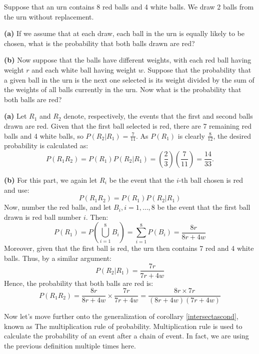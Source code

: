         \begin{example}
            Suppose that an urn contains 8 red balls and 4 white balls. We draw 2 balls from the urn without replacement.
            
            \textbf{(a)} If we assume that at each draw, each ball in the urn is equally likely to be chosen, what is the probability that both balls drawn are red?
            
            \textbf{(b)} Now suppose that the balls have different weights, with each red ball having weight \(r\) and each white ball having weight \(w\). Suppose that the probability that a given ball in the urn is the next one selected is its weight divided by the sum of the weights of all balls currently in the urn. Now what is the probability that both balls are red?
            \end{example}
            
            \begin{solution}
            \textbf{(a)} Let \( R_1 \) and \( R_2 \) denote, respectively, the events that the first and second balls drawn are red. Given that the first ball selected is red, there are 7 remaining red balls and 4 white balls, so \( P(R_2|R_1) = \frac{7}{11} \). As \( P(R_1) \) is clearly \(\frac{8}{12}\), the desired probability is calculated as:
            \[
            P(R_1 R_2) = P(R_1)P(R_2|R_1) = \left(\frac{2}{3}\right)\left(\frac{7}{11}\right) = \frac{14}{33}.
            \]
            
            \textbf{(b)} For this part, we again let \( R_i \) be the event that the \(i\)-th ball chosen is red and use:
            \[
            P(R_1 R_2) = P(R_1)P(R_2|R_1)
            \]
            Now, number the red balls, and let \( B_i, i = 1, \ldots, 8 \) be the event that the first ball drawn is red ball number \( i \). Then:
            \[
            P(R_1) = P\left(\bigcup_{i=1}^8 B_i\right) = \sum_{i=1}^8 P(B_i) = \frac{8r}{8r + 4w}
            \]
            Moreover, given that the first ball is red, the urn then contains 7 red and 4 white balls. Thus, by a similar argument:
            \[
            P(R_2|R_1) = \frac{7r}{7r + 4w}
            \]
            Hence, the probability that both balls are red is:
            \[
            P(R_1 R_2) = \frac{8r}{8r + 4w} \times \frac{7r}{7r + 4w} = \frac{8r \times 7r}{(8r + 4w)(7r + 4w)}
            \]
            \end{solution}
    
        Now let's move further onto the generalization of corollary \ref{intersectascond}, known as The multiplication rule of probability.
        Multiplication rule is used to calculate the probability of an event after a chain of event.
        In fact, we are using the previous definition multiple times here.
        
